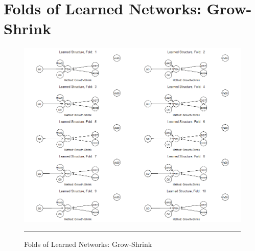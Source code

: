 
\chapter{Folds of Learned Networks: Grow-Shrink} %

\label{AppendixC} %

\begin{figure}[htbp]%
	\centering
		\includegraphics[scale=0.5]{Figures/gs.png}
		\rule{35em}{0.5pt}
	\caption{Folds of Learned Networks: Grow-Shrink}
\end{figure}